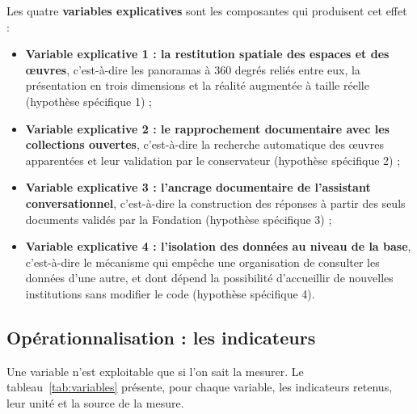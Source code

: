 Les quatre \textbf{variables explicatives} sont les composantes qui produisent
cet effet :

\begin{itemize}
  \item \textbf{Variable explicative 1 : la restitution spatiale des espaces et
        des œuvres}, c'est-à-dire les panoramas à 360 degrés reliés entre eux,
        la présentation en trois dimensions et la réalité augmentée à taille
        réelle (hypothèse spécifique 1) ;
  \item \textbf{Variable explicative 2 : le rapprochement documentaire avec les
        collections ouvertes}, c'est-à-dire la recherche automatique des œuvres
        apparentées et leur validation par le conservateur (hypothèse spécifique
        2) ;
  \item \textbf{Variable explicative 3 : l'ancrage documentaire de l'assistant
        conversationnel}, c'est-à-dire la construction des réponses à partir des
        seuls documents validés par la Fondation (hypothèse spécifique 3) ;
  \item \textbf{Variable explicative 4 : l'isolation des données au niveau de la
        base}, c'est-à-dire le mécanisme qui empêche une organisation de
        consulter les données d'une autre, et dont dépend la possibilité
        d'accueillir de nouvelles institutions sans modifier le code (hypothèse
        spécifique 4).
\end{itemize}

\subsection{Opérationnalisation : les indicateurs}

Une variable n'est exploitable que si l'on sait la mesurer. Le
tableau~\ref{tab:variables} présente, pour chaque variable, les indicateurs
retenus, leur unité et la source de la mesure.

